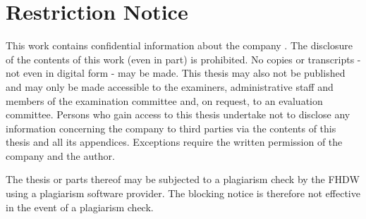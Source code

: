 \section*{Restriction Notice}

This work contains confidential information about the company \koorperationsunternehmen. The disclosure of the contents of this work (even in part) is prohibited. No copies or transcripts - not even in digital form - may be made. This thesis may also not be published and may only be made accessible to the examiners, administrative staff and members of the examination committee and, on request, to an evaluation committee. Persons who gain access to this thesis undertake not to disclose any information concerning the company \koorperationsunternehmen{} to third parties via the contents of this thesis and all its appendices. Exceptions require the written permission of the company \koorperationsunternehmen{} and the author.

The thesis or parts thereof may be subjected to a plagiarism check by the FHDW using a plagiarism software provider. The blocking notice is therefore not effective in the event of a plagiarism check.
\newpage
\fancyhead[R]{\leftmark}